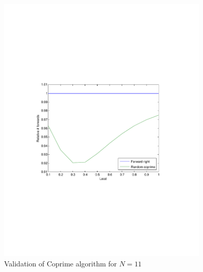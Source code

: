 \documentclass[10pt,a4paper]{article}
\begin{document}
\begin{figure}[h!tb]
\centering
\includegraphics[clip=true, trim=9em 24em 9em 24em, width=0.9\textwidth]{resources/plotrandcoprime11.pdf}
\caption{Validation of Coprime algorithm for $N=11$}
\label{validcp11}
\end{figure}
\end{document}
